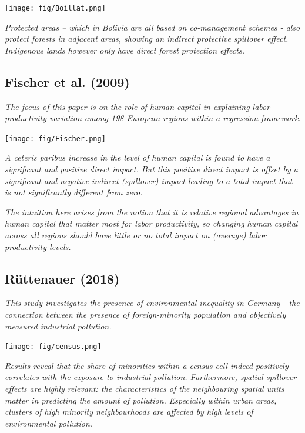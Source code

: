 \documentclass[
  letterpaper,
  DIV=11,
  numbers=noendperiod]{scrreprt}
\begin{document}
\texttt{[image: fig/Boillat.png]}

\emph{Protected areas -- which in Bolivia are all based on co-management
schemes - also protect forests in adjacent areas, showing an indirect
protective spillover effect. Indigenous lands however only have direct
forest protection effects.}

\hypertarget{fischer.2009}{%
\subsection*{Fischer et al. (2009)}\label{fischer.2009}}

\emph{The focus of this paper is on the role of human capital in
explaining labor productivity variation among 198 European regions
within a regression framework.}

\texttt{[image: fig/Fischer.png]}

\emph{A ceteris paribus increase in the level of human capital is found
to have a significant and positive direct impact. But this positive
direct impact is offset by a significant and negative indirect
(spillover) impact leading to a total impact that is not significantly
different from zero.}

\emph{The intuition here arises from the notion that it is relative
regional advantages in human capital that matter most for labor
productivity, so changing human capital across all regions should have
little or no total impact on (average) labor productivity levels.}

\hypertarget{ruttenauer.2018a}{%
\subsection*{Rüttenauer (2018)}\label{ruttenauer.2018a}}

\emph{This study investigates the presence of environmental inequality
in Germany - the connection between the presence of foreign-minority
population and objectively measured industrial pollution.}

\texttt{[image: fig/census.png]}

\emph{Results reveal that the share of minorities within a census cell
indeed positively correlates with the exposure to industrial pollution.
Furthermore, spatial spillover effects are highly relevant: the
characteristics of the neighbouring spatial units matter in predicting
the amount of pollution. Especially within urban areas, clusters of high
minority neighbourhoods are affected by high levels of environmental
pollution.}
\end{document}
